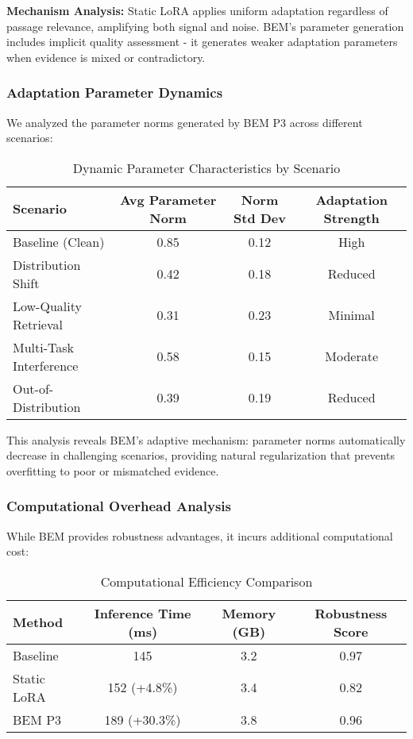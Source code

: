 \textbf{Mechanism Analysis:} Static LoRA applies uniform adaptation regardless of passage relevance, amplifying both signal and noise. BEM's parameter generation includes implicit quality assessment - it generates weaker adaptation parameters when evidence is mixed or contradictory.

\subsubsection{Adaptation Parameter Dynamics}

We analyzed the parameter norms generated by BEM P3 across different scenarios:

\begin{table}[h]
\centering
\caption{Dynamic Parameter Characteristics by Scenario}
\label{tab:param_dynamics}
\small
\begin{tabular}{l|c|c|c}
\toprule
\textbf{Scenario} & \textbf{Avg Parameter Norm} & \textbf{Norm Std Dev} & \textbf{Adaptation Strength} \\
\midrule
Baseline (Clean) & 0.85 & 0.12 & High \\
Distribution Shift & 0.42 & 0.18 & Reduced \\
Low-Quality Retrieval & 0.31 & 0.23 & Minimal \\
Multi-Task Interference & 0.58 & 0.15 & Moderate \\
Out-of-Distribution & 0.39 & 0.19 & Reduced \\
\bottomrule
\end{tabular}
\end{table}

This analysis reveals BEM's adaptive mechanism: parameter norms automatically decrease in challenging scenarios, providing natural regularization that prevents overfitting to poor or mismatched evidence.

\subsubsection{Computational Overhead Analysis}

While BEM provides robustness advantages, it incurs additional computational cost:

\begin{table}[h]
\centering
\caption{Computational Efficiency Comparison}
\label{tab:efficiency}
\small
\begin{tabular}{l|c|c|c}
\toprule
\textbf{Method} & \textbf{Inference Time (ms)} & \textbf{Memory (GB)} & \textbf{Robustness Score} \\
\midrule
Baseline & 145 & 3.2 & 0.97 \\
Static LoRA & 152 (+4.8\%) & 3.4 & 0.82 \\
BEM P3 & 189 (+30.3\%) & 3.8 & 0.96 \\
\bottomrule
\end{tabular}
\end{table}

